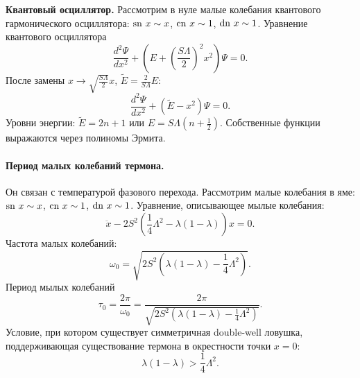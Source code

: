 \documentclass[12pt]{article}
\begin{document}
\textbf{Квантовый осциллятор.}
Рассмотрим в нуле малые колебания квантового гармонического осциллятора: $\textrm{sn}~x \sim x$, $\textrm{cn}~x \sim 1$, $\textrm{dn}~x \sim 1$.
Уравнение квантового осциллятора
%
\begin{equation}
\frac{d^2 \Psi}{dx^2} + (E + \left( \frac{S \Lambda}{2} \right)^2 x^2) \Psi = 0.
\end{equation}
%
После замены $x \to \sqrt{\frac{S \Lambda}{2}} x$, $\tilde{E} = \frac{2}{S \Lambda} E$:
%
\begin{equation}
\frac{d^2 \Psi}{dx^2} + (\tilde{E} - x^2) \Psi = 0.
\end{equation}
%
Уровни энергии: $\tilde{E} = 2n + 1$ или $E = S \Lambda (n + \frac{1}{2})$.
Собственные функции выражаются через полиномы Эрмита.

\paragraph{Период малых колебаний термона.}
Он связан с температурой фазового перехода.
Рассмотрим малые колебания в яме: $\textrm{sn}~x \sim x$, $\textrm{cn}~x \sim 1$, $\textrm{dn}~x \sim 1$.
Уравнение, описывающее мылые колебания:
%
\begin{equation}
\ddot{x} - 2S^2 (\frac{1}{4} \Lambda^2 - \lambda (1 - \lambda)) x = 0.
\end{equation}
%
Частота малых колебаний:
%
\begin{equation}
\omega_0 = \sqrt{2S^2 (\lambda (1 - \lambda) - \frac{1}{4} \Lambda^2)}.
\end{equation}
%
Период мылых колебаний
%
\begin{equation}
\tau_0 = \frac{2 \pi}{\omega_0} = \frac{2 \pi}{\sqrt{2S^2 (\lambda (1 - \lambda) - \frac{1}{4} \Lambda^2)}}.
\end{equation}
%
Условие, при котором существует симметричная double-well ловушка, поддерживающая существование термона в окрестности точки $x = 0$:
%
\begin{equation}
\lambda (1 - \lambda) > \frac{1}{4} \Lambda^2.
\end{equation}
%
\end{document}
